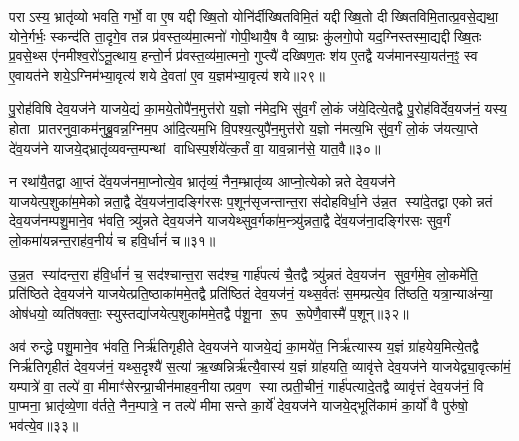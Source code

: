 पराऽस्य॒ भ्रातृ॑व्यो भवति॒ गर्भो॒ वा ए॒ष यद्दीख्षि॒तो योनि॑र्दीख्षितविमि॒तं यद्दीख्षि॒तो दीख्षितविमि॒तात्प्र॒वसे॒द्यथा॒ योने॒र्गर्भः॒ स्कन्द॑ति ता॒दृगे॒व तन्न प्र॑वस्त॒व्य॑मा॒त्मनो॑ गोपी॒थायै॒ष वै व्या॒घ्रः कु॑लगो॒पो यद॒ग्निस्तस्मा॒द्यद्दीख्षि॒तः प्र॒वसे॒थ्स ए॑नमीश्व॒रो॑ऽनू॒त्थाय॒ हन्तो॒र्न प्र॑वस्त॒व्य॑मा॒त्मनो॒ गुप्त्यै॑ दख्षिण॒तः श॑य ए॒तद्वै यज॑मानस्या॒यत॑न॒ꣵ॒ स्व ए॒वायत॑ने शये॒ऽग्निम॑भ्या॒वृत्य॑ शये दे॒वता॑ ए॒व य॒ज्ञम॑भ्या॒वृत्य॑ शये॥२९॥

{\anuvakamend[{ए॒तद्वै क्रू॒र इ॒वैक॑व्रता आ॒त्मना॒ यज॑मानस्य॒ त्रयो॑दश च॥५॥}]}

पु॒रोह॑विषि देव॒यज॑ने याजये॒द्यं का॒मये॒तोपै॑न॒मुत्त॑रो य॒ज्ञो न॑मेद॒भि सु॑व॒र्गं लो॒कं ज॑ये॒दित्ये॒तद्वै पु॒रोह॑विर्देव॒यज॑नं॒ यस्य॒ होता प्रातरनुवा॒कम॑नुब्रु॒वन्न॒ग्निम॒प आ॑दि॒त्यम॒भि वि॒पश्य॒त्युपै॑न॒मुत्त॑रो य॒ज्ञो न॑मत्य॒भि सु॑व॒र्गं लो॒कं ज॑यत्या॒प्ते दे॑व॒यज॑ने याजये॒द्भ्रातृ॑व्यवन्त॒म्पन्थां वाधिस्प॒र्\mbox{}शये॑त्क॒र्तं वा॒ याव॒न्नान॑से॒ यात॒वै॥३०॥

न रथा॑यै॒तद्वा आ॒प्तं दे॑व॒यज॑नमा॒प्नोत्ये॒व भ्रातृ॑व्यं॒ नैन॒म्भ्रातृ॑व्य आप्नो॒त्येकोन्नते देव॒यज॑ने याजयेत्प॒शुका॑म॒मेकोन्नता॒द्वै दे॑व॒यज॑ना॒दङ्गि॑रसः प॒शून॑सृजन्तान्त॒रा स॑दोहविर्धा॒ने उ॑न्न॒त स्या॑दे॒तद्वा एकोन्नतं देव॒यज॑नम्पशु॒माने॒व भ॑वति॒ त्र्यु॑न्नते देव॒यज॑ने याजयेथ्सुव॒र्गका॑म॒न्त्र्यु॑न्नता॒द्वै दे॑व॒यज॑ना॒दङ्गि॑रसः सुव॒र्गं लो॒कमा॑यन्नन्त॒राह॑व॒नीयं॑ च हवि॒र्धानं॑ च॥३१॥

उ॒न्न॒त स्या॑दन्त॒रा ह॑वि॒र्धानं॑ च॒ सद॑श्चान्त॒रा सद॑श्च॒ गार्\mbox{}ह॑पत्यं चै॒तद्वै त्र्यु॑न्नतं देव॒यज॑न सुव॒र्गमे॒व लो॒कमे॑ति॒ प्रति॑ष्ठिते देव॒यज॑ने याजयेत्प्रति॒ष्ठाका॑ममे॒तद्वै प्रति॑ष्ठितं देव॒यज॑नं॒ यथ्स॒र्वतः॑ स॒मम्प्रत्ये॒व ति॑ष्ठति॒ यत्रा॒न्याअ॑न्या॒ ओष॑धयो॒ व्यति॑षक्ताः॒ स्युस्तद्या॑जयेत्प॒शुका॑ममे॒तद्वै प॑शू॒ना रू॒प रू॒पेणै॒वास्मै॑ प॒शून्॥३२॥

अव॑ रुन्द्धे पशु॒माने॒व भ॑वति॒ निर्\mbox{}ऋ॑तिगृहीते देव॒यज॑ने याजये॒द्यं का॒मये॑त॒ निर्\mbox{}ऋ॑त्यास्य य॒ज्ञं ग्रा॑हयेय॒मित्ये॒तद्वै निर्\mbox{}ऋ॑तिगृहीतं देव॒यज॑नं॒ यथ्स॒दृश्यै॑ स॒त्या॑ ऋ॒ख्षन्निर्\mbox{}ऋ॑त्यै॒वास्य॑ य॒ज्ञं ग्रा॑हयति॒ व्यावृ॑त्ते देव॒यज॑ने याजयेद्व्या॒वृत्का॑मं॒ यम्पात्रे॑ वा॒ तल्पे॑ वा॒ मीमाꣳ॑सेरन्प्रा॒चीन॑माहव॒नीयात्प्रव॒ण स्यात्प्रती॒चीनं॒ गार्\mbox{}ह॑पत्यादे॒तद्वै व्यावृ॑त्तं देव॒यज॑नं॒ वि पा॒प्मना॒ भ्रातृ॑व्ये॒णा व॑र्तते॒ नैन॒म्पात्रे॒ न तल्पे॑ मीमासन्ते का॒र्ये॑ देव॒यज॑ने याजये॒द्भूति॑कामं का॒र्यो॑ वै पुरु॑षो॒ भव॑त्ये॒व॥३३॥

{\anuvakamend[{यात॒वै ह॑वि॒र्धान॑ञ्च प॒शून्पा॒प्मना॒ऽष्टाद॑श च॥६॥}]}

